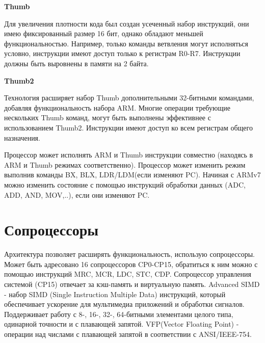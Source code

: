 \textbf{Thumb}

Для увеличения плотности кода был создан усеченный набор инструкций, они имею фиксированный размер 16 бит, однако обладают меньшей функциональностью. Например, только команды ветвления могут исполняться условно, инструкции имеют доступ только к регистрам R0-R7. Инструкции должны быть выровнены в памяти на 2 байта.

\textbf{Thumb2}

Технология расширяет набор Thumb дополнительными 32-битными командами, добавляя функциональность набора ARM. Многие операции требующие нескольких Thumb команд, могут быть выполнены эффективнее с использованием Thumb2. Инструкции имеют доступ ко всем регистрам общего назначения.

Процессор может исполнять ARM и Thumb инструкции совместно (находясь в ARM и Thumb режимах соответственно). Процессор может изменить режим выполнив команды BX, BLX, LDR/LDM(если изменяют PC). Начиная с ARMv7 можно изменить состояние с помощью инструкций обработки данных (ADC, ADD, AND, MOV,..), если они изменяют PC.

\section{Сопроцессоры}

Архитектура позволяет расширять функциональность, использую сопроцессоры. Может быть адресовано 16 сопроцессоров CP0-CP15, обратиться к ним можно с помощью инструкций MRC, MCR, LDC, STC, CDP. Сопроцессор управления системой (CP15) отвечает за кэш-память и виртуальную память.
Advanced SIMD - набор SIMD (Single Instruction Multiple Data) инструкций, который обеспечивает ускорение для мультимедиа приложений и обработки сигналов. Поддерживает работу с 8-, 16-, 32-, 64-битными элементами целого типа, одинарной точности и с плавающей запятой. VFP(Vector Floating Point) - операции над числами с плавающей запятой в соответствии с ANSI/IEEE-754.





